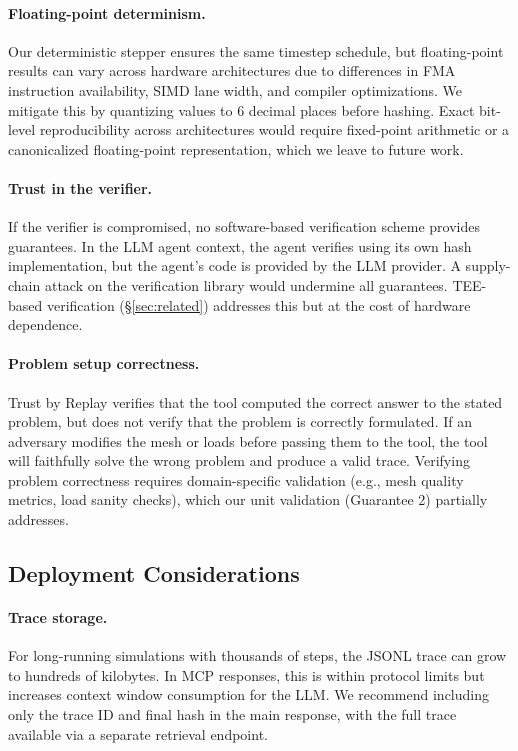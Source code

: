 \documentclass[letterpaper,twocolumn,10pt]{article}
\begin{document}
\paragraph{Floating-point determinism.} Our deterministic stepper ensures
the same timestep schedule, but floating-point results can vary across
hardware architectures due to differences in FMA instruction availability,
SIMD lane width, and compiler optimizations. We mitigate this by quantizing
values to 6 decimal places before hashing. Exact bit-level reproducibility
across architectures would require fixed-point arithmetic or a canonicalized
floating-point representation, which we leave to future work.

\paragraph{Trust in the verifier.} If the verifier is compromised, no
software-based verification scheme provides guarantees. In the LLM agent
context, the agent verifies using its own hash implementation, but the agent's
code is provided by the LLM provider. A supply-chain attack on the
verification library would undermine all guarantees. TEE-based verification
(\S\ref{sec:related}) addresses this but at the cost of hardware dependence.

\paragraph{Problem setup correctness.} Trust by Replay verifies that the
tool computed the correct answer to the stated problem, but does not verify
that the problem is correctly formulated. If an adversary modifies the mesh
or loads before passing them to the tool, the tool will faithfully solve the
wrong problem and produce a valid trace. Verifying problem correctness
requires domain-specific validation (e.g., mesh quality metrics, load
sanity checks), which our unit validation (Guarantee 2) partially addresses.

\subsection{Deployment Considerations}

\paragraph{Trace storage.} For long-running simulations with thousands of
steps, the JSONL trace can grow to hundreds of kilobytes. In MCP responses,
this is within protocol limits but increases context window consumption for
the LLM. We recommend including only the trace ID and final hash in the
main response, with the full trace available via a separate retrieval
endpoint.
\end{document}
